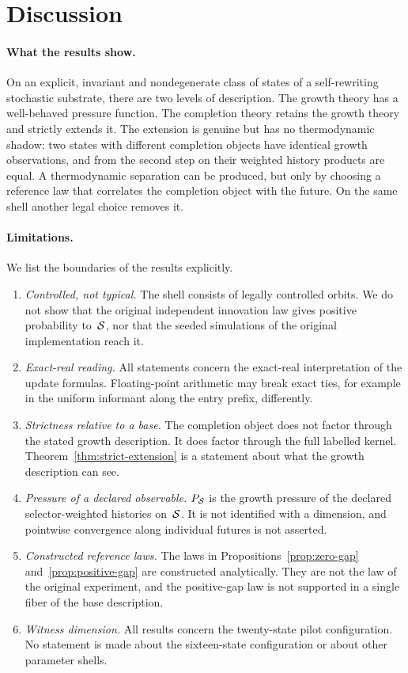 \section{Discussion}\label{sec:discussion}

\paragraph{What the results show.}
On an explicit, invariant and nondegenerate class of states of a self-rewriting stochastic substrate, there are two levels of description. The growth theory has a well-behaved pressure function. The completion theory retains the growth theory and strictly extends it. The extension is genuine but has no thermodynamic shadow: two states with different completion objects have identical growth observations, and from the second step on their weighted history products are equal. A thermodynamic separation can be produced, but only by choosing a reference law that correlates the completion object with the future. On the same shell another legal choice removes it.

\paragraph{Limitations.}
We list the boundaries of the results explicitly.
\begin{enumerate}
  \item \emph{Controlled, not typical.} The shell consists of legally controlled orbits. We do not show that the original independent innovation law gives positive probability to~$\mathcal{S}$, nor that the seeded simulations of the original implementation reach it.
  \item \emph{Exact-real reading.} All statements concern the exact-real interpretation of the update formulas. Floating-point arithmetic may break exact ties, for example in the uniform informant along the entry prefix, differently.
  \item \emph{Strictness relative to a base.} The completion object does not factor through the stated growth description. It does factor through the full labelled kernel. Theorem~\ref{thm:strict-extension} is a statement about what the growth description can see.
  \item \emph{Pressure of a declared observable.} $P_{\mathcal{S}}$ is the growth pressure of the declared selector-weighted histories on~$\mathcal{S}$. It is not identified with a dimension, and pointwise convergence along individual futures is not asserted.
  \item \emph{Constructed reference laws.} The laws in Propositions~\ref{prop:zero-gap} and~\ref{prop:positive-gap} are constructed analytically. They are not the law of the original experiment, and the positive-gap law is not supported in a single fiber of the base description.
  \item \emph{Witness dimension.} All results concern the twenty-state pilot configuration. No statement is made about the sixteen-state configuration or about other parameter shells.
\end{enumerate}

